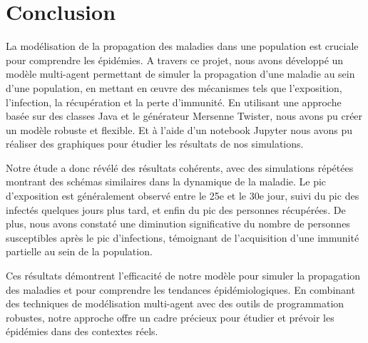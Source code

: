\documentclass[french]{article}
\begin{document}
\section{Conclusion}
La modélisation de la propagation des maladies dans une population est cruciale pour comprendre les épidémies. A travers ce projet, nous avons développé un modèle multi-agent permettant de simuler la propagation d'une maladie au sein d'une population, en mettant en œuvre des mécanismes tels que l'exposition, l'infection, la récupération et la perte d'immunité. En utilisant une approche basée sur des classes Java et le générateur Mersenne Twister, nous avons pu créer un modèle robuste et flexible. Et à l'aide d'un notebook Jupyter nous avons pu réaliser des graphiques pour étudier les résultats de nos simulations.

Notre étude a donc révélé des résultats cohérents, avec des simulations répétées montrant des schémas similaires dans la dynamique de la maladie. Le pic d'exposition est généralement observé entre le 25e et le 30e jour, suivi du pic des infectés quelques jours plus tard, et enfin du pic des personnes récupérées. De plus, nous avons constaté une diminution significative du nombre de personnes susceptibles après le pic d'infections, témoignant de l'acquisition d'une immunité partielle au sein de la population.

Ces résultats démontrent l'efficacité de notre modèle pour simuler la propagation des maladies et pour comprendre les tendances épidémiologiques. En combinant des techniques de modélisation multi-agent avec des outils de programmation robustes, notre approche offre un cadre précieux pour étudier et prévoir les épidémies dans des contextes réels.
\end{document}
